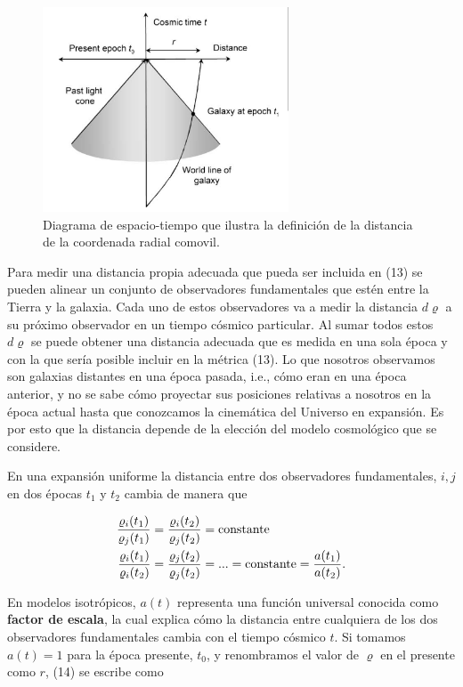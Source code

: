\documentclass{article}
\begin{document}
\begin{figure}               \includegraphics[width=0.65\textwidth]{cono_luz_pp159.png}
        \caption{\footnotesize{Diagrama de espacio-tiempo que ilustra la definición de la distancia de la coordenada radial comovil.}}
    \end{figure}
    
    
Para medir una distancia propia adecuada que pueda ser incluida en (13)  se pueden alinear un conjunto de observadores fundamentales que estén entre la Tierra y la galaxia. Cada uno de estos observadores va a medir la distancia $d \varrho$ a su próximo observador en un tiempo cósmico particular. Al sumar todos estos $d \varrho$ se puede obtener una distancia adecuada que es medida en una sola época y con la que sería posible incluir en la métrica (13). Lo que nosotros observamos son galaxias distantes en una época pasada, i.e., cómo eran en una época anterior, y no se sabe cómo proyectar sus posiciones relativas a nosotros en la época actual hasta que conozcamos la cinemática del Universo en expansión. Es por esto que la distancia depende de la elección del modelo cosmológico que se considere. 

En una expansión uniforme la distancia entre dos observadores fundamentales, $i,j$ en dos épocas $t_1$ y $t_2$ cambia de manera que 

    \begin{align}
        \frac{\varrho_i(t_1)}{\varrho_j(t_1)} & = \frac{\varrho_i(t_2)}{\varrho_j(t_2)} = {\text{constante}} \notag \\
        \frac{\varrho_i(t_1)}{\varrho_i(t_2)} & = \frac{\varrho_j(t_2)}{\varrho_j(t_2)} = ... =  {\text{constante}} = \frac{a(t_1)}{a(t_2)}.
    \end{align}


En modelos isotrópicos, $a(t)$ representa una función universal conocida como {\bf{factor de escala}}, la cual explica cómo la distancia entre cualquiera de los dos observadores fundamentales cambia con el tiempo cósmico $t$. 
Si tomamos $a(t) = 1$ para la época presente, $t_0$, y renombramos el valor de $\varrho$ en el presente como $r$, (14) se escribe como
\end{document}
